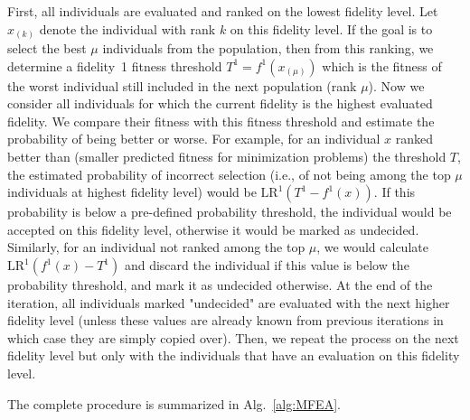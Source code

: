 First, all individuals are evaluated and ranked on the lowest fidelity level. Let $x_{(k)}$ denote the individual with rank $k$ on this fidelity level. If the goal is to select the best $\mu$ individuals from the population, then from this ranking, we determine a fidelity~1 fitness threshold $T^1=f^1(x_{(\mu)})$ which is the fitness of the worst individual still included in the next population (rank $\mu$). Now we consider all individuals for which the current fidelity is the highest evaluated fidelity. We compare their fitness with this fitness threshold and estimate the probability of being better or worse. For example, for an individual $x$ ranked better than (smaller predicted fitness for minimization problems) the threshold $T$, the estimated probability of incorrect selection (i.e., of not being among the top $\mu$ individuals at highest fidelity level) would be $\mbox{LR}^1(T^1-f^1(x))$. If this probability is below a pre-defined probability threshold, the individual would be accepted on this fidelity level, otherwise it would be marked as undecided. Similarly, for an individual not ranked among the top $\mu$, we would calculate $\mbox{LR}^1(f^1(x)-T^1)$ and discard the individual if this value is below the probability threshold, and mark it as undecided otherwise.
At the end of the iteration, all individuals marked "undecided" are evaluated with the next higher fidelity level (unless these values are already known from previous iterations in which case they are simply copied over).
Then, we repeat the process on the next fidelity level but only with the individuals that have an evaluation on this fidelity level.

The complete procedure is summarized in Alg.~\ref{alg:MFEA}.

